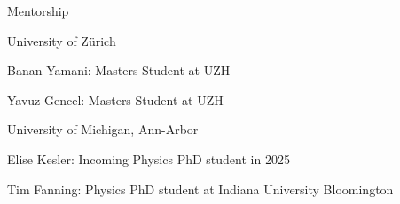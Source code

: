 \documentclass{resume} %
\begin{document}
\begin{rSection}{Mentorship}
\begin{rSubsection}{University of Zürich}{}{}{}
    \item Banan Yamani: Masters Student at UZH
    \item Yavuz Gencel: Masters Student at UZH
\end{rSubsection}

\begin{rSubsection}{University of Michigan, Ann-Arbor}{}{}{}
    \item Elise Kesler: Incoming Physics PhD student in 2025
    \item Tim Fanning: Physics PhD student at Indiana University Bloomington
\end{rSubsection}

\end{rSection}

%

\end{document}
